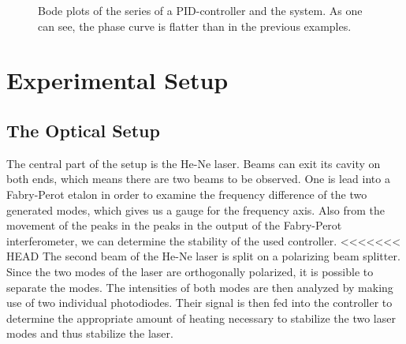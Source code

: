 \documentclass[a4paper,10pt]{article}
\begin{document}
\begin{figure}[htp!]
\caption{Bode plots of the series of a PID-controller and the system. As one can see, the phase curve is flatter than in the previous examples. }
\label{fig_bode_pid}
\end{figure}

\section{Experimental Setup}
\subsection{The Optical Setup}
The central part of the setup is the He-Ne laser. Beams can exit its cavity on both ends, which means there are two beams to be observed. One is lead into a Fabry-Perot etalon in order to examine the frequency difference of the two generated modes, which gives us a gauge for the frequency axis. Also from the movement of the peaks in the peaks in the output of the Fabry-Perot interferometer, we can determine the stability of the used controller.
\newline
<<<<<<< HEAD
The second beam of the He-Ne laser is split on a polarizing beam splitter. Since the two modes of the laser are orthogonally polarized, it is possible to separate the modes. The intensities of both modes are then analyzed by making use of two individual photodiodes. Their signal is then fed into the controller to determine the appropriate amount of heating necessary to stabilize the two laser modes and thus stabilize the laser.
\end{document}
